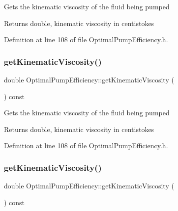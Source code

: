Gets the kinematic viscosity of the fluid being pumped

\begin{DoxyReturn}{Returns}
double, kinematic viscosity in centistokes 
\end{DoxyReturn}


Definition at line 108 of file Optimal\+Pump\+Efficiency.\+h.

\mbox{\label{class_optimal_pump_efficiency_a8c2f7fcacce2b42ed83f29aec2d4671e}} 
\subsubsection{\texorpdfstring{get\+Kinematic\+Viscosity()}{getKinematicViscosity()}\hspace{0.1cm}{\footnotesize\ttfamily [2/3]}}
{\footnotesize\ttfamily double Optimal\+Pump\+Efficiency\+::get\+Kinematic\+Viscosity (\begin{DoxyParamCaption}{ }\end{DoxyParamCaption}) const\hspace{0.3cm}{\ttfamily [inline]}}

Gets the kinematic viscosity of the fluid being pumped

\begin{DoxyReturn}{Returns}
double, kinematic viscosity in centistokes 
\end{DoxyReturn}


Definition at line 108 of file Optimal\+Pump\+Efficiency.\+h.

\mbox{\label{class_optimal_pump_efficiency_a8c2f7fcacce2b42ed83f29aec2d4671e}} 
\subsubsection{\texorpdfstring{get\+Kinematic\+Viscosity()}{getKinematicViscosity()}\hspace{0.1cm}{\footnotesize\ttfamily [3/3]}}
{\footnotesize\ttfamily double Optimal\+Pump\+Efficiency\+::get\+Kinematic\+Viscosity (\begin{DoxyParamCaption}{ }\end{DoxyParamCaption}) const\hspace{0.3cm}{\ttfamily [inline]}}

